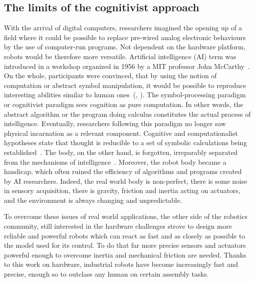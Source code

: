 \subsection{The limits of the cognitivist approach} %


With the arrival of digital computers, researchers imagined the opening up of a field where it could be possible to replace pre-wired analog electronic behaviours by the use of computer-run programs. Not dependent on the hardware platform, robots would be therefore more versatile.
Artificial intelligence (AI) term was introduced in a workshop organized in 1956 by a MIT professor John McCarthy~\parencite{mccarthy1978history}. On the whole, participants were convinced, that by using the notion of computation or abstract symbol manipulation, it would be possible to reproduce interesting abilities similar to human ones~(\cite{kaufmann1979machines}, \cite{haugeland1989artificial}). The symbol-processing paradigm or cognitivist paradigm sees cognition as pure computation. In other words, the abstract algorithm or the program doing calculus constitutes the actual process of intelligence. Eventually, researchers following this paradigm no longer saw physical incarnation as a relevant component. Cognitive and computationalist hypotheses state that thought is reducible to a set of symbolic calculations being established~\parencite{fodor1987psychosemantics}. The body, on the other hand, is forgotten, irreparably separated from the mechanisms of intelligence~\parencite{kaplan2008corps}.
Moreover, the robot body became a handicap, which often ruined the efficiency of algorithms and programs created by AI researchers. Indeed, the real world body is non-perfect, there is some noise in sensory acquisition, there is gravity, friction and inertia acting on actuators, and the environment is always changing and unpredictable.

To overcome these issues of real world applications, the other side of the robotics community, still interested in the hardware challenges strove to design more reliable and powerful robots which can react as fast and as closely as possible to the model used for its control. To do that far more precise sensors and actuators powerful enough to overcome inertia and mechanical friction are needed. Thanks to this work on hardware, industrial robots have become increasingly fast and precise, enough so to outclass any human on certain assembly tasks.


